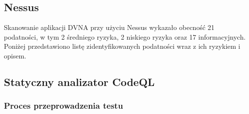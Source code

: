 \subsection{Nessus}
\label{subsec:nessus}
Skanowanie aplikacji DVNA przy użyciu Nessus wykazało obecność 21 podatności, w tym 2 średniego ryzyka, 2 niskiego ryzyka oraz 17 informacyjnych. Poniżej przedstawiono listę zidentyfikowanych podatności wraz z ich ryzykiem i opisem.


\subsection{Statyczny analizator CodeQL}\label{subsec:codeql}

\subsubsection{Proces przeprowadzenia testu}

